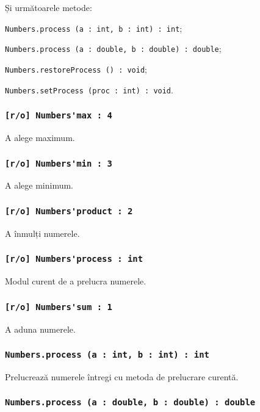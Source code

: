 Și următoarele metode:
\begin{icItems}
	\item \lstinline|Numbers.process (a : int, b : int) : int|;
	\item \lstinline|Numbers.process (a : double, b : double) : double|;
	\item \lstinline|Numbers.restoreProcess () : void|;
	\item \lstinline|Numbers.setProcess (proc : int) : void|.
\end{icItems}

\subsubsection{\lstinline|[r/o] Numbers'max : 4|}

A alege maximum.

\subsubsection{\lstinline|[r/o] Numbers'min : 3|}

A alege minimum.

\subsubsection{\lstinline|[r/o] Numbers'product : 2|}

A înmulți numerele.

\subsubsection{\lstinline|[r/o] Numbers'process : int|}

Modul curent de a prelucra numerele.

\subsubsection{\lstinline|[r/o] Numbers'sum : 1|}

A aduna numerele.

\subsubsection{\lstinline|Numbers.process (a : int, b : int) : int|}

Prelucrează numerele întregi cu metoda de prelucrare curentă.

\subsubsection{\lstinline|Numbers.process (a : double, b : double) : double|}

